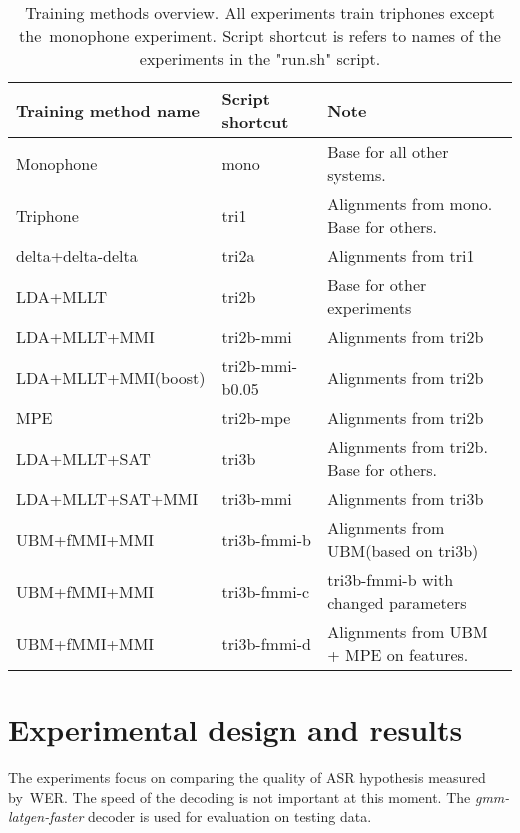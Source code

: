 \begin{table}[!htp]\label{tab:disc_train}
\small{\begin{tabular}{lll}
\hline
Training method name & Script shortcut & Note\\
\hline
Monophone & mono & Base for all other systems.\\
Triphone  & tri1 &  Alignments from mono. Base for others.\\
delta+delta-delta & tri2a & Alignments from tri1 \\
\ac{LDA}+\ac{MLLT} & tri2b &  Base for other experiments \\
\ac{LDA}+\ac{MLLT}+\ac{MMI} & tri2b-mmi & Alignments from tri2b \\
\ac{LDA}+\ac{MLLT}+\ac{MMI}(boost) & tri2b-mmi-b0.05  & Alignments from tri2b \\
\ac{MPE} & tri2b-mpe & Alignments from tri2b \\
\ac{LDA}+\ac{MLLT}+\ac{SAT} & tri3b & Alignments from tri2b. Base for others. \\
\ac{LDA}+\ac{MLLT}+\ac{SAT}+\ac{MMI} & tri3b-mmi  & Alignments from tri3b \\
\ac{UBM}+\ac{fMMI}+\ac{MMI} & tri3b-fmmi-b & Alignments from \ac{UBM}(based on tri3b) \\
\ac{UBM}+\ac{fMMI}+\ac{MMI} & tri3b-fmmi-c & tri3b-fmmi-b with changed parameters \\
\ac{UBM}+\ac{fMMI}+\ac{MMI} & tri3b-fmmi-d & Alignments from \ac{UBM} + \ac{MPE} on features.\\ 
\end{tabular}}
\caption{Training methods overview. All experiments train triphones except the~monophone experiment. Script shortcut is refers to names of the experiments in the "run.sh" script.}
\end{table}


\section{Experimental design and results} 
\label{sec:exps}
The experiments focus on comparing the quality of ASR hypothesis measured by~\ac{WER}.
The speed of the decoding is not important at this moment.  The {\it gmm-latgen-faster}\/ decoder is used for evaluation on testing data. 

